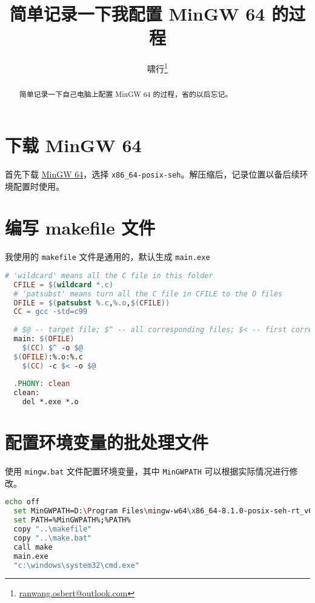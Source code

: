 \documentclass{ctexart}
\title{简单记录一下我配置 MinGW 64 的过程}
\author{啸行\thanks{\url{ranwang.osbert@outlook.com}}}
\begin{document}
  
\maketitle

\begin{abstract}
  简单记录一下自己电脑上配置 MinGW 64 的过程，省的以后忘记。
\end{abstract}

\section{下载 MinGW 64}

首先下载 \href{https://sourceforge.net/projects/mingw-w64/files/mingw-w64/}{MinGW 64}，选择 \texttt{x86\_64-posix-seh}。解压缩后，记录位置以备后续环境配置时使用。

\section{编写 makefile 文件}

我使用的 \texttt{makefile} 文件是通用的，默认生成 \texttt{main.exe}

\begin{lstlisting}[language=make]
  # 'wildcard' means all the C file in this folder
  CFILE = $(wildcard *.c)
  # 'patsubst' means turn all the C file in CFILE to the O files
  OFILE = $(patsubst %.c,%.o,$(CFILE))
  CC = gcc -std=c99
  
  # $@ -- target file; $^ -- all corresponding files; $< -- first corresponding files
  main: $(OFILE)
    $(CC) $^ -o $@
  $(OFILE):%.o:%.c
    $(CC) -c $< -o $@
  
  .PHONY: clean
  clean:
    del *.exe *.o
\end{lstlisting}

\section{配置环境变量的批处理文件}

使用 \texttt{mingw.bat} 文件配置环境变量，其中 \texttt{MinGWPATH} 可以根据实际情况进行修改。

\begin{lstlisting}[language = bash]
  echo off
  set MinGWPATH=D:\Program Files\mingw-w64\x86_64-8.1.0-posix-seh-rt_v6-rev0\mingw64\bin
  set PATH=%MinGWPATH%;%PATH%
  copy "..\makefile"
  copy "..\make.bat"
  call make
  main.exe
  "c:\windows\system32\cmd.exe"
\end{lstlisting}
\end{document}
